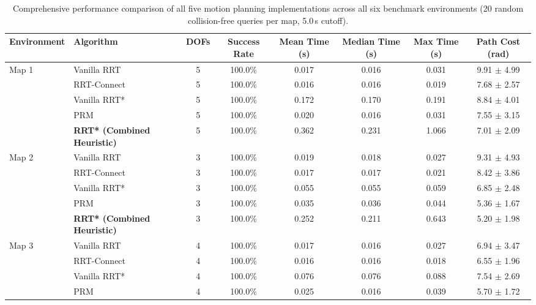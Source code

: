 \begin{table}[t]
\centering
\small
\caption{Comprehensive performance comparison of all five motion planning implementations across all six benchmark environments (20 random collision-free queries per map, 5.0\,s cutoff).}
\label{tab:comprehensive_planner_results}
\begin{tabular}{llcccccc}
\toprule
\textbf{Environment} & \textbf{Algorithm} & \textbf{DOFs} & \textbf{Success Rate} & \textbf{Mean Time (s)} & \textbf{Median Time (s)} & \textbf{Max Time (s)} & \textbf{Path Cost (rad)} \\
\midrule
\multirow{5}{*}{Map 1} & Vanilla RRT & 5 & 100.0\% & 0.017 & 0.016 & 0.031 &  9.91 $\pm$ 4.99 \\
 & RRT-Connect & 5 & 100.0\% & 0.016 & 0.016 & 0.019 &  7.68 $\pm$ 2.57 \\
 & Vanilla RRT* & 5 & 100.0\% & 0.172 & 0.170 & 0.191 &  8.84 $\pm$ 4.01 \\
 & PRM & 5 & 100.0\% & 0.020 & 0.016 & 0.031 &  7.55 $\pm$ 3.15 \\
 & \textbf{RRT* (Combined Heuristic)} & 5 & 100.0\% & 0.362 & 0.231 & 1.066 &  7.01 $\pm$ 2.09 \\
\midrule
\multirow{5}{*}{Map 2} & Vanilla RRT & 3 & 100.0\% & 0.019 & 0.018 & 0.027 &  9.31 $\pm$ 4.93 \\
 & RRT-Connect & 3 & 100.0\% & 0.017 & 0.017 & 0.021 &  8.42 $\pm$ 3.86 \\
 & Vanilla RRT* & 3 & 100.0\% & 0.055 & 0.055 & 0.059 &  6.85 $\pm$ 2.48 \\
 & PRM & 3 & 100.0\% & 0.035 & 0.036 & 0.044 &  5.36 $\pm$ 1.67 \\
 & \textbf{RRT* (Combined Heuristic)} & 3 & 100.0\% & 0.252 & 0.211 & 0.643 &  5.20 $\pm$ 1.98 \\
\midrule
\multirow{5}{*}{Map 3} & Vanilla RRT & 4 & 100.0\% & 0.017 & 0.016 & 0.027 &  6.94 $\pm$ 3.47 \\
 & RRT-Connect & 4 & 100.0\% & 0.016 & 0.016 & 0.018 &  6.55 $\pm$ 1.96 \\
 & Vanilla RRT* & 4 & 100.0\% & 0.076 & 0.076 & 0.088 &  7.54 $\pm$ 2.69 \\
 & PRM & 4 & 100.0\% & 0.025 & 0.016 & 0.039 &  5.70 $\pm$ 1.72 \\

\end{tabular}
\end{table}
